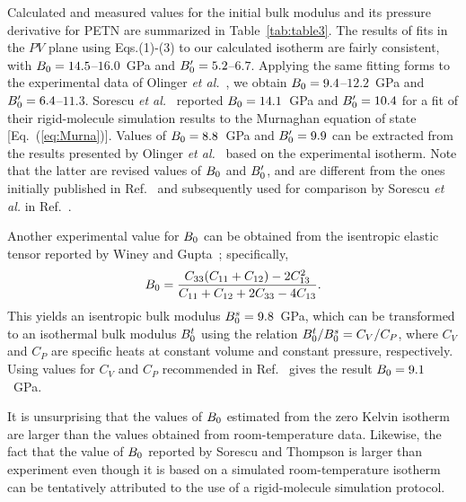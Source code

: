 \documentclass[prb,aps,nobibnotes,twocolumn,doublespace,twocolumngrid,superbib]{revtex4}
\begin{document}
Calculated and measured values for the initial bulk modulus and its
pressure derivative for PETN are summarized in Table~\ref{tab:table3}.
The results of fits in the $PV$ plane using Eqs.(1)-(3) to our
calculated isotherm are fairly consistent, with
$B_0=14.5$--$16.0$~GPa and ${B'_0}=5.2$--$6.7$.  Applying the same
fitting forms to the experimental data of Olinger {\it et
al.}~\cite{Olinger_1975v62}, we obtain $B_0=9.4$--$12.2$~GPa and
${B'_0}=6.4$--$11.3$.  Sorescu {\it et al.}~\cite{Sorescu_1999v103}
reported $B_0=14.1$~GPa and ${B'_0}=10.4 $ for a fit of their
rigid-molecule simulation results to the Murnaghan equation of state
[Eq.~(\ref{eq:Murna})].  Values of $B_0=8.8$~GPa and ${B'_0}=9.9$
can be extracted from the results presented by Olinger {\it et
al.}~\cite{Olinger_1976} based on the experimental isotherm. Note that
the latter are revised values of $B_0$ and ${B'_0}$, and are
different from the ones initially published in
Ref.~\cite{Olinger_1975v62} and subsequently used for comparison by
Sorescu {\it et al.}\/ in Ref.~\cite{Sorescu_1999v103}.  

Another experimental value for $B_0$ can be obtained from the isentropic
elastic tensor reported by Winey and Gupta~\cite{Winey_2001v90};
specifically,
\begin{equation}
B_0=\frac{C_{33}(C_{11}+C_{12})-2C_{13}^2}{C_{11}+C_{12}+2C_{33}-4C_{13}}.
\end{equation}
This yields an isentropic bulk modulus $B_0^{s}=9.8$~GPa, which
can be transformed to an isothermal bulk modulus $B_0^t$ using the
relation $B_0^t/B_0^s=C_V/C_P$, where $C_V$ and $C_P$ are specific
heats at constant volume and constant pressure, respectively.  Using
values for $C_V$ and $C_P$ recommended in Ref.~\cite{Olinger_1976}
gives the result $B_0=9.1$~GPa.

It is unsurprising that the values of $B_0$ estimated from the zero
Kelvin isotherm are larger than the values obtained from
room-temperature data.  Likewise, the fact that the value of $B_0$
reported by Sorescu and Thompson is larger than experiment even though
it is based on a simulated room-temperature isotherm can be
tentatively attributed to the use of a rigid-molecule simulation
protocol.
\end{document}
